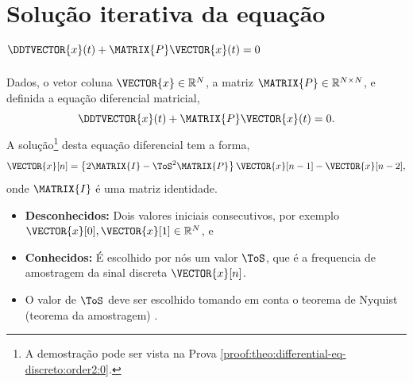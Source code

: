 \section{ Solução iterativa da equação $\DDTVECTOR{x}(t) + \MATRIX{P} \VECTOR{x}(t)=0$ }

\begin{theorem}[Equação 
$\DDTVECTOR{x}(t) + \MATRIX{P} \VECTOR{x}(t)=0$ com diferenças finitas:]
\label{theo:differential-eq-discreto:order2:0}
Dados, o vetor coluna $\VECTOR{x} \in \mathbb{R}^N$, a matriz $\MATRIX{P} \in \mathbb{R}^{N\times N}$, 
e definida a equação diferencial matricial,
\begin{equation}\label{eq:theo:secondorder:1}
\DDTVECTOR{x}(t) + \MATRIX{P} \VECTOR{x}(t)=0.
\end{equation}
A solução\footnote{A
demostração pode ser vista na Prova \ref{proof:theo:differential-eq-discreto:order2:0}.} desta equação diferencial tem  a forma,
\begin{equation}\label{eq:theo:secondorder:2}
  \VECTOR{x}[n]=\left\{2\MATRIX{I} - \ToS^2 \MATRIX{P}\right\}\VECTOR{x}[n-1]-\VECTOR{x}[n-2],
\end{equation}
onde $\MATRIX{I}$ é uma matriz identidade.
\begin{itemize}
\item \textbf{Desconhecidos:} Dois valores iniciais consecutivos, por exemplo $\VECTOR{x}[0],\VECTOR{x}[1] \in \mathbb{R}^{N}$, e
\item  \textbf{Conhecidos:} É escolhido por nós um valor $\ToS$, 
que é a frequencia de amostragem da sinal discreta $\VECTOR{x}[n]$.
\end{itemize}
\end{theorem}

\begin{tcbattention}
\begin{itemize}
\item O valor de $\ToS$ deve ser escolhido tomando em conta o teorema de Nyquist (teorema da amostragem) 
\cite[pp. 67]{rochol2009comunicacao} \cite[pp. 122]{forouzan2009comunicacao}.
\end{itemize}
\end{tcbattention}

